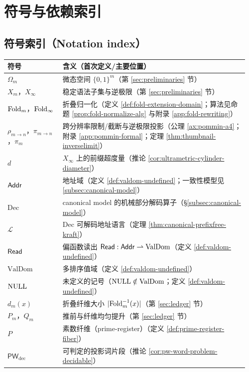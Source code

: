 \section*{符号与依赖索引}

\subsection*{符号索引（Notation index）}
\begin{tabular}{>{\raggedright\arraybackslash}p{0.22\linewidth} p{0.74\linewidth}}
\toprule
符号 & 含义（首次定义/主要位置）\\
\midrule
$\Omega_m$ & 微态空间 $\{0,1\}^m$（第 \ref{sec:preliminaries} 节）\\
$X_m$，$X_\infty$ & 稳定语法子集与逆极限（第 \ref{sec:preliminaries} 节）\\
$\mathrm{Fold}_m$，$\mathrm{Fold}_\infty$ & 折叠归一化（定义 \ref{def:fold-extension-domain}；算法见命题 \ref{prop:fold-normalize-alg} 与附录 \ref{app:fold-rewriting}）\\
$\rho_{m\to n}$，$\pi_{m\to n}$，$\pi_m$ & 跨分辨率限制/截断与逆极限投影（公理 \ref{ax:pommin-a4}；附录 \ref{app:pommin-formal}；定理 \ref{thm:thumbnail-inverselimit}）\\
$d$ & $X_\infty$ 上的前缀超度量（推论 \ref{cor:ultrametric-cylinder-diameter}）\\
$\mathsf{Addr}$ & 地址域（定义 \ref{def:valdom-undefined}；一致性模型见 \ref{subsec:canonical-model}）\\
$\mathrm{Dec}$ & canonical model 的机械部分解码算子（\S\ref{subsec:canonical-model}）\\
$\mathcal{L}$ & $\mathrm{Dec}$ 可解码地址语言（定理 \ref{thm:canonical-prefixfree-kraft}）\\
$\mathsf{Read}$ & 偏函数读出 $\mathsf{Read}:\mathsf{Addr}\rightharpoonup \mathrm{ValDom}$（定义 \ref{def:valdom-undefined}）\\
$\mathrm{ValDom}$ & 多排序值域（定义 \ref{def:valdom-undefined}）\\
$\mathrm{NULL}$ & 未定义的记号（$\mathrm{NULL}\notin\mathrm{ValDom}$；定义 \ref{def:valdom-undefined}）\\
$d_m(x)$ & 折叠纤维大小 $|\mathrm{Fold}_m^{-1}(x)|$（第 \ref{sec:ledger} 节）\\
$P_m$，$Q_m$ & 推前与纤维均匀提升（第 \ref{sec:ledger} 节）\\
$P$ & 素数纤维（prime-register）（定义 \ref{def:prime-register-fiber}）\\
$\mathsf{PW}_{\mathrm{dec}}$ & 可判定的投影词片段（推论 \ref{cor:pw-word-problem-decidable}）\\

\end{tabular}
